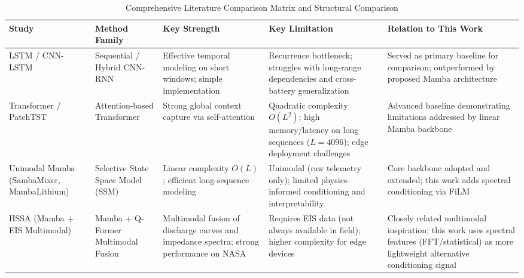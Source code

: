 \begin{table}[H]
  \caption{Comprehensive Literature Comparison Matrix and Structural
           Comparison}
  \label{tab:literature}
  \centering
  \scriptsize
  \linespread{0.92}\selectfont
  \tabtight
  \begin{tabularx}{\textwidth}{|M{1.95cm}|M{1.5cm}|Y|Y|Y|}
    \hline
    \textbf{Study} & \textbf{Method Family} & \textbf{Key Strength} &
    \textbf{Key Limitation} & \textbf{Relation to This Work} \\
    \hline
    LSTM / CNN-LSTM \cite{arbaoui2024,zhao2024}
      & Sequential / Hybrid CNN-RNN
      & Effective temporal modeling on short windows; simple implementation
      & Recurrence bottleneck; struggles with long-range dependencies and
        cross-battery generalization
      & Served as primary baseline for comparison; outperformed by proposed
        Mamba architecture \\
    \hline
    Transformer / PatchTST \cite{patel2025}
      & Attention-based Transformer
      & Strong global context capture via self-attention
      & Quadratic complexity $O(L^{2})$; high memory/latency on long sequences
        ($L=4096$); edge deployment challenges
      & Advanced baseline demonstrating limitations addressed by linear Mamba
        backbone \\
    \hline
    Unimodal Mamba (SambaMixer,
        MambaLithium) \cite{olalde2024}
      & Selective State Space Model (SSM)
      & Linear complexity $O(L)$; efficient long-sequence modeling
      & Unimodal (raw telemetry only); limited physics-informed conditioning
        and interpretability
      & Core backbone adopted and extended; this work adds spectral
        conditioning via FiLM \\
    \hline
    HSSA (Mamba $+$ EIS Multimodal) \cite{meng2026}
      & Mamba + Q-Former Multimodal Fusion
      & Multimodal fusion of discharge curves and impedance spectra; strong
        performance on NASA
      & Requires EIS data (not always available in field); higher complexity
        for edge devices
      & Closely related multimodal inspiration; this work uses spectral
        features (FFT/statistical) as more lightweight alternative
        conditioning signal \\
    \hline
  \end{tabularx}
\end{table}
